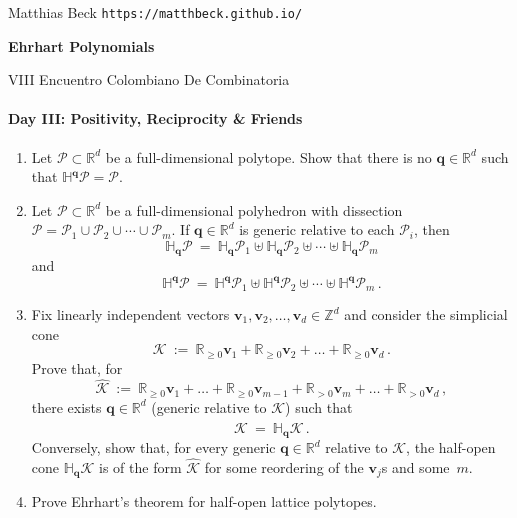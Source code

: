 \documentclass[11pt]{article}
\def\bq{\mathbf{q}}
\def\bv{\mathbf{v}}
\def\cP{\mathcal{P}}
\def\RR{\mathbb{R}}
\def\ZZ{\mathbb{Z}}
\def\hopen{\mathbb{H}}
\begin{document}

{\sc Matthias Beck} \hfill {\tt https://matthbeck.github.io/}


\newpage
\begin{center}
\Large{\bf Ehrhart Polynomials} 

\normalsize
VIII Encuentro Colombiano De Combinatoria
\end{center}

\paragraph{Day III: Positivity, Reciprocity \& Friends}

\begin{enumerate}[(1)]
\vspace{-10pt}

\item Let $\cP \subset \RR^d$ be a full-dimensional polytope.
Show that there is no $\bq \in \RR^d$ such that $\hopen^\bq \cP = \cP$.

\item Let $\cP \subset \RR^d$ be a full-dimensional polyhedron with dissection $\cP = \cP_1 \cup \cP_2 \cup \cdots \cup \cP_m$.
If $\bq \in \RR^d$ is generic relative to each $\cP_i$, then
\[
  \hopen_\bq \cP \ = \ \hopen_\bq \cP_1 \uplus \hopen_\bq \cP_2 \uplus \cdots \uplus
\hopen_\bq \cP_m 
\]
and
\[
  \hopen^\bq \cP \ = \ \hopen^\bq \cP_1 \uplus \hopen^\bq \cP_2 \uplus \cdots \uplus
\hopen^\bq \cP_m \, .
\]

\def\Rnn{\RR_{ \ge 0 }} 
\newcommand\Chat{\widehat{\mathcal{K}}}
\newcommand\Ccheck{\widecheck{\mathcal{K}}}
\newcommand\C{\mathcal{K}}

\item Fix linearly independent vectors $\bv_1, \bv_2, \dots, \bv_d \in \ZZ^d$ and consider the simplicial cone
\[
  \C \ := \ \Rnn \bv_1 + \Rnn \bv_2 + \dots + \Rnn \bv_d \, .
\]
Prove that, for
\[
  \Chat \ := \ \Rnn \bv_1 + \dots + \Rnn \bv_{ m-1 } + \RR_{ >0 } \bv_m + \dots + \RR_{ >0 } \bv_d \, ,
\]
there exists $\bq \in \RR^d$ (generic relative to $\C$) such that
\[
  \Chat \ = \ \hopen_\bq \C \, .
\]
Conversely, show that, for every generic $\bq \in \RR^d$ relative to $\C$, the half-open cone $\hopen_\bq \C$ is of the form $\Chat$ for some reordering of the $\bv_j$s and some~$m$.

\item Prove Ehrhart's theorem for half-open lattice polytopes.


\end{enumerate}
\end{document}
